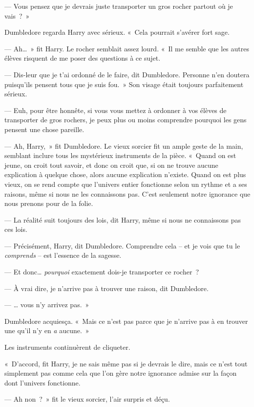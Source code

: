 --- Vous pensez que je devrais juste transporter un gros rocher partout où je vais~?~»

Dumbledore regarda Harry avec sérieux.
«~Cela pourrait s'avérer fort sage.

--- Ah…~» fit Harry.
Le rocher semblait assez lourd.
«~Il me semble que les autres élèves risquent de me poser des questions à ce sujet.

--- Dis-leur que je t'ai ordonné de le faire, dit Dumbledore.
Personne n'en doutera puisqu'ils pensent tous que je suis fou.~»
Son visage était toujours parfaitement sérieux.

--- Euh, pour être honnête, si vous vous mettez à ordonner à vos élèves de transporter de gros rochers, je peux plus ou moins comprendre pourquoi les gens pensent une chose pareille.

--- Ah, Harry,~» fit Dumbledore.
Le vieux sorcier fit un ample geste de la main, semblant inclure tous les mystérieux instruments de la pièce.
«~Quand on est jeune, on croit tout savoir, et donc on croit que, si on ne trouve aucune explication à quelque chose, alors aucune explication n'existe.
Quand on est plus vieux, on se rend compte que l'univers entier fonctionne selon un rythme et a ses raisons, même si nous ne les connaissons pas.
C'est seulement notre ignorance que nous prenons pour de la folie.

--- La réalité suit toujours des lois, dit Harry, même si nous ne connaissons pas ces lois.

--- Précisément, Harry, dit Dumbledore.
Comprendre cela -- et je vois que tu le \emph{comprends} -- est l'essence de la sagesse.

--- Et donc… \emph{pourquoi} exactement dois-je transporter ce rocher~?

--- À vrai dire, je n'arrive pas à trouver une raison, dit Dumbledore.

--- … vous n'y arrivez pas.~»

Dumbledore acquiesça.
«~Mais ce n'est pas parce que je n'arrive pas à en trouver une qu'il n'y en \emph{a} aucune.~»

Les instruments continuèrent de cliqueter.

«~D'accord, fit Harry, je ne sais même pas si je devrais le dire, mais ce n'est tout simplement pas comme cela que l'on gère notre ignorance admise sur la façon dont l'univers fonctionne.

--- Ah non~?~» fit le vieux sorcier, l'air surpris et déçu.

